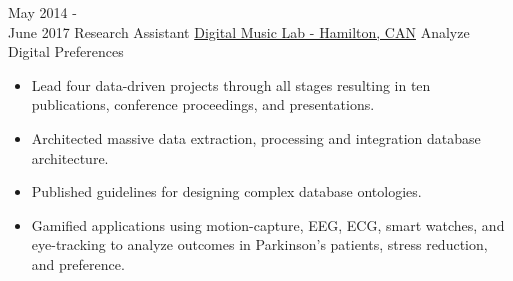 \documentclass[letterpaper]{twentysecondcv} %
\newcommand{\Triangle}{\ding{228}}
\begin{document}
\begin{twenty}
	\expitem
    	{May 2014 - \\June 2017}
        {Research Assistant}
        {\href{http://digitalmusiclab.org/}{Digital Music Lab - Hamilton, CAN}}
        {Analyze Digital Preferences}
        {
        {\begin{itemize}[label=\Triangle,noitemsep]
            \item Lead four data-driven projects through all stages resulting in ten publications, conference proceedings, and presentations.
            \item Architected massive data extraction, processing and integration database architecture.
            \item Published guidelines for designing complex database ontologies.
            \item Gamified applications using motion-capture, EEG, ECG, smart watches, and eye-tracking to analyze outcomes in Parkinson's patients, stress reduction, and preference.
    \end{itemize}}
        }
\end{twenty}

\vspace{-.5cm}
\end{document}
